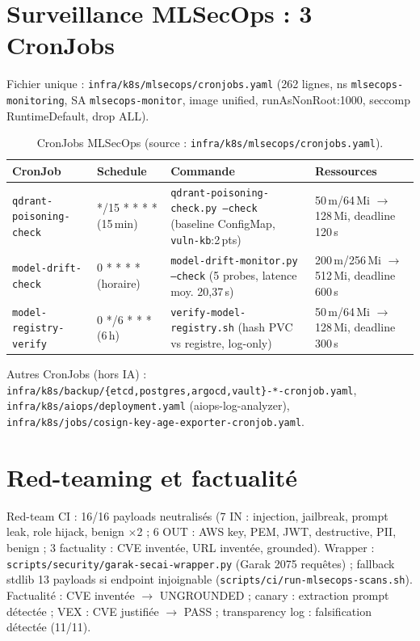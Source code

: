 \documentclass[12pt,a4paper,openany]{report}
\begin{document}
\section{Surveillance MLSecOps : 3 CronJobs}

Fichier unique : \texttt{infra/k8s/mlsecops/cronjobs.yaml} (262 lignes,
ns \texttt{mlsecops-monitoring}, SA \texttt{mlsecops-monitor}, image unified,
runAsNonRoot:1000, seccomp RuntimeDefault, drop ALL).

\begin{table}[h]
\centering
\small
\begin{tabular}{@{}llll@{}}
\toprule
\textbf{CronJob} & \textbf{Schedule} & \textbf{Commande} & \textbf{Ressources} \\
\midrule
\texttt{qdrant-poisoning-check} & */15 * * * * (15\,min) & \texttt{qdrant-poisoning-check.py --check} (baseline ConfigMap, \texttt{vuln-kb}:2\,pts) & 50\,m/64\,Mi $\rightarrow$ 128\,Mi, deadline 120\,s \\
\texttt{model-drift-check} & 0 * * * * (horaire) & \texttt{model-drift-monitor.py --check} (5 probes, latence moy. 20,37\,s) & 200\,m/256\,Mi $\rightarrow$ 512\,Mi, deadline 600\,s \\
\texttt{model-registry-verify} & 0 */6 * * * (6\,h) & \texttt{verify-model-registry.sh} (hash PVC vs registre, log-only) & 50\,m/64\,Mi $\rightarrow$ 128\,Mi, deadline 300\,s \\
\bottomrule
\end{tabular}
\caption{CronJobs MLSecOps (source : \texttt{infra/k8s/mlsecops/cronjobs.yaml}).}
\label{tab:cronjobs}
\end{table}

Autres CronJobs (hors IA) : \texttt{infra/k8s/backup/\{etcd,postgres,argocd,vault\}-*-cronjob.yaml},
\texttt{infra/k8s/aiops/deployment.yaml} (aiops-log-analyzer),
\texttt{infra/k8s/jobs/cosign-key-age-exporter-cronjob.yaml}.

\section{Red-teaming et factualité}

Red-team CI : 16/16 payloads neutralisés (7 IN : injection, jailbreak, prompt leak,
role hijack, benign $\times$2 ; 6 OUT : AWS key, PEM, JWT, destructive, PII, benign ;
3 factuality : CVE inventée, URL inventée, grounded).
Wrapper : \texttt{scripts/security/garak-secai-wrapper.py} (Garak 2075 requêtes) ;
fallback stdlib 13 payloads si endpoint injoignable (\texttt{scripts/ci/run-mlsecops-scans.sh}).
Factualité : CVE inventée $\rightarrow$ UNGROUNDED ; canary : extraction prompt détectée ;
VEX : CVE justifiée $\rightarrow$ PASS ; transparency log : falsification détectée (11/11).
\end{document}
